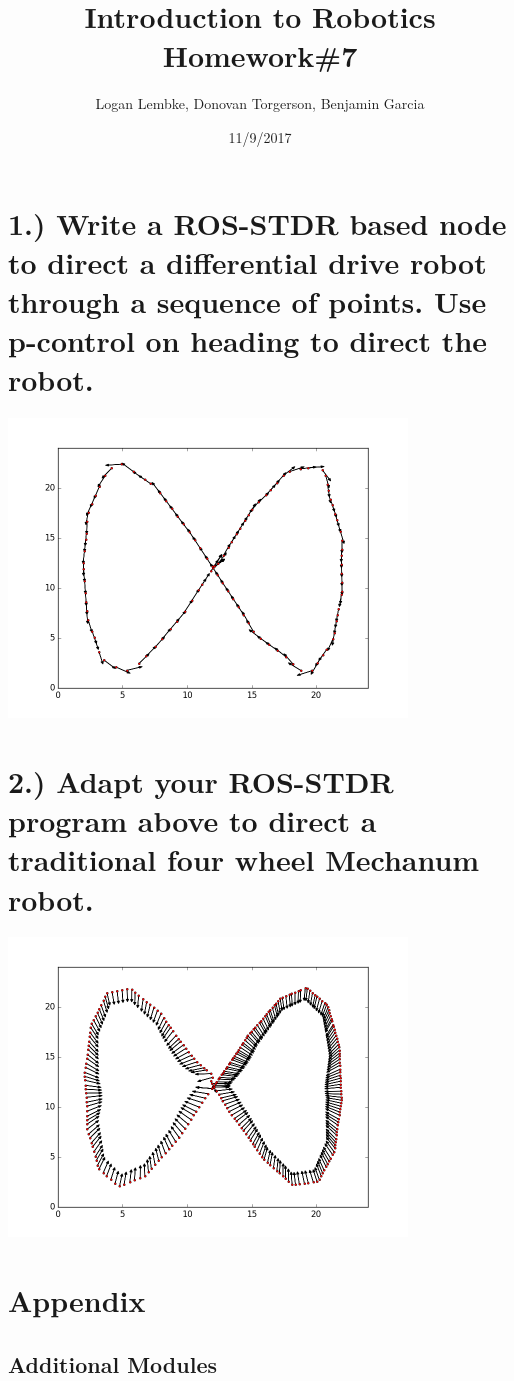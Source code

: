 \documentclass[10pt]{article}
\title{Introduction to Robotics\\ Homework\#7}
\date{11/9/2017}
\author{Logan Lembke, Donovan Torgerson, Benjamin Garcia}
\begin{document}
\maketitle
\newpage

\section*{1.) Write a ROS-STDR based node to direct a differential drive robot through a sequence of points. Use p-control on heading to direct the robot.}

\includegraphics[width = \linewidth, height = 300px]{ddFig8.png}
\newpage
\section*{2.) Adapt your ROS-STDR program above to direct a traditional four wheel Mechanum robot.}

\includegraphics[width = \linewidth, height = 300px]{mecFig8.png}
\newpage
\section*{Appendix}
\subsection*{Additional Modules}

\newpage

\end{document}
